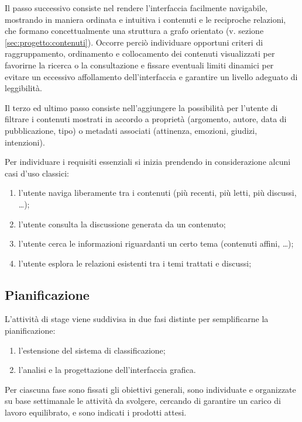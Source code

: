 Il passo successivo consiste nel rendere l'interfaccia facilmente navigabile, mostrando in maniera ordinata e intuitiva i contenuti e le reciproche relazioni, che formano concettualmente una struttura a grafo orientato (v. sezione \ref{sec:progetto:contenuti}). Occorre perciò individuare opportuni criteri di raggruppamento, ordinamento e collocamento dei contenuti visualizzati per favorirne la ricerca o la consultazione e fissare eventuali limiti dinamici per evitare un eccessivo affollamento dell'interfaccia e garantire un livello adeguato di leggibilità.%

Il terzo ed ultimo passo consiste nell'aggiungere la possibilità per l'utente di filtrare i contenuti mostrati in accordo a proprietà (argomento, autore, data di pubblicazione, tipo) o metadati associati (attinenza, emozioni, giudizi, intenzioni).

Per individuare i requisiti essenziali si inizia prendendo in considerazione alcuni casi d'uso classici:
\begin{enumerate}
\item l'utente naviga liberamente tra i contenuti (più recenti, più letti, più discussi, \ldots);
\item l'utente consulta la discussione generata da un contenuto;
\item l'utente cerca le informazioni riguardanti un certo tema (contenuti affini, \ldots);
\item l'utente esplora le relazioni esistenti tra i temi trattati e discussi; %
\end{enumerate}

\subsection{Pianificazione}
L'attività di stage viene suddivisa in due fasi distinte per semplificarne la pianificazione:
\begin{enumerate}
\item l'estensione del sistema di classificazione;
\item l'analisi e la progettazione dell'interfaccia grafica.
\end{enumerate}

Per ciascuna fase sono fissati gli obiettivi generali, sono individuate e organizzate su base settimanale le attività da svolgere, cercando di garantire un carico di lavoro equilibrato, e sono indicati i prodotti attesi.

